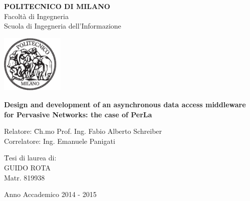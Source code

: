 \begin{titlepage}
\begin{center}

\begin{large}
	\textbf{POLITECNICO DI MILANO}\\
	Facoltà di Ingegneria\\
	Scuola di Ingegneria dell'Informazione
\end{large}

\vspace{2cm}
\includegraphics[width=3cm]{imgs/poli.pdf}

\vspace{2cm}
\begin{Large}
\textbf{
Design and development of an asynchronous data access middleware for Pervasive Networks: the case of PerLa
}
\end{Large}

\vfill

\begin{normalsize}
\begin{onehalfspace}

	\begin{flushleft}
	\begin{tabbing}
	Relatore: \hspace{8pt} \= Ch.mo Prof. Ing. Fabio Alberto Schreiber\\
	Correlatore: \> Ing. Emanuele Panigati
	\end{tabbing}
	\end{flushleft}

	\vspace{1cm}
	\begin{flushright}
	\begin{tabbing}
	\hspace{330pt}
	\= Tesi di laurea di:\\
	\> GUIDO ROTA \\
	\> Matr. 819938\\
	\end{tabbing}
	\end{flushright}
	
\end{onehalfspace}
\end{normalsize}

\vspace{2cm}
\begin{small}
Anno Accademico 2014 - 2015
\end{small}

\end{center}
\end{titlepage}
\restoregeometry
